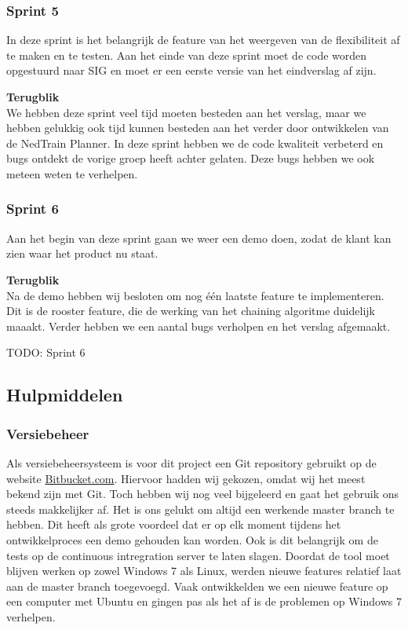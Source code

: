 \subsubsection{Sprint 5}
In deze sprint is het belangrijk de feature van het weergeven van de flexibiliteit af te maken en te testen. Aan het einde van deze sprint moet de code worden opgestuurd naar SIG en moet er een eerste versie van het eindverslag af zijn. 

\textbf{Terugblik} \\
We hebben deze sprint veel tijd moeten besteden aan het verslag, maar we hebben gelukkig ook tijd kunnen besteden aan het verder door ontwikkelen van de NedTrain Planner. In deze sprint hebben we de code kwaliteit verbeterd en bugs ontdekt de vorige groep heeft achter gelaten. Deze bugs hebben we ook meteen weten te verhelpen.

\subsubsection{Sprint 6}
Aan het begin van deze sprint gaan we weer een demo doen, zodat de klant kan zien waar het product nu staat. 

\textbf{Terugblik} \\
Na de demo hebben wij besloten om nog \'e\'en laatste feature te implementeren. Dit is de rooster feature, die de werking van het chaining algoritme duidelijk maaakt. Verder hebben we een aantal bugs verholpen en het verslag afgemaakt. 

TODO: Sprint 6

\subsection{Hulpmiddelen}
\subsubsection{Versiebeheer}
\label{subsec:versiebeheer}
Als versiebeheersysteem is voor dit project een Git repository gebruikt op de website \href{http://bitbucket.com}{Bitbucket.com}. Hiervoor hadden wij gekozen, omdat wij het meest bekend zijn met Git. Toch hebben wij nog veel bijgeleerd en gaat het gebruik ons steeds makkelijker af. Het is ons gelukt om altijd een werkende master branch te hebben. Dit heeft als grote voordeel dat er op elk moment tijdens het ontwikkelproces een demo gehouden kan worden. Ook is dit belangrijk om de tests op de continuous intregration server te laten slagen. Doordat de tool moet blijven werken op zowel Windows 7 als Linux, werden nieuwe features relatief laat aan de master branch toegevoegd. Vaak ontwikkelden we een nieuwe feature op een computer met Ubuntu en gingen pas als het af is de problemen op Windows 7 verhelpen.

